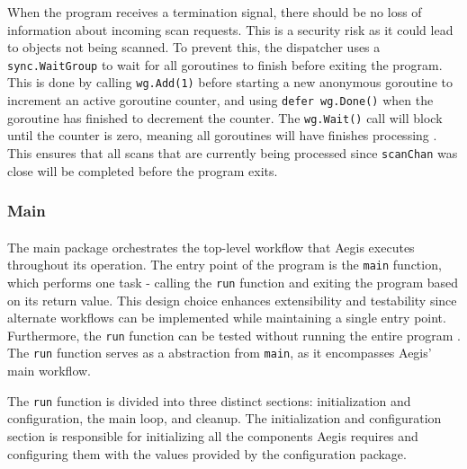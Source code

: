 \documentclass[12pt, conference, final, a4paper, onecolumn, compsoc]{IEEEtran}
\begin{document}
When the program receives a termination signal, there should be no loss of
information about incoming scan requests. This is a security risk as it could
lead to objects not being scanned. To prevent this, the dispatcher uses a
\texttt{sync.WaitGroup} to wait for all goroutines to finish before exiting the
program. This is done by calling \texttt{wg.Add(1)} before starting a new
anonymous goroutine to increment an active goroutine counter, and using
\texttt{defer wg.Done()} when the goroutine has finished to decrement the
counter. The \texttt{wg.Wait()} call will block until the counter is zero,
meaning all goroutines will have finishes processing \citep{go-waitgroups}. This
ensures that all scans that are currently being processed since
\texttt{scanChan} was close will be completed before the program exits.


\subsubsection*{Main}
\paragraph{}


The main package orchestrates the top-level workflow that Aegis executes
throughout its operation. The entry point of the program is the \texttt{main}
function, which performs one task - calling the \texttt{run} function and
exiting the program based on its return value. This design choice enhances
extensibility and testability since alternate workflows can be implemented while
maintaining a single entry point. Furthermore, the \texttt{run} function can be
tested without running the entire program \citep{go-tiny-abstraction}. The
\texttt{run} function serves as a abstraction from \texttt{main}, as it
encompasses Aegis' main workflow.

The \texttt{run} function is divided into three distinct sections:
initialization and configuration, the main loop, and cleanup. The initialization
and configuration section is responsible for initializing all the components
Aegis requires and configuring them with the values provided by the
configuration package.
\end{document}
